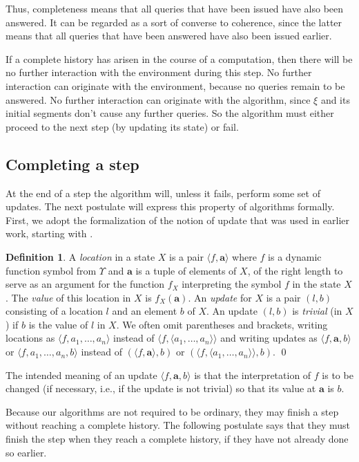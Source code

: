 \documentclass{LMCS}
\theoremstyle{definition}
\newtheorem{df}[thm]{Definition}
\newcommand{\bld}[1]{\ensuremath{\mathbf {#1}}}
\newcommand{\sq}[1]{\ensuremath{\langle#1\rangle}}
\begin{document}
Thus, completeness means that all queries that have been issued have
also been answered.  It can be regarded as a sort of converse to
coherence, since the latter means that all queries that have
been answered have also been issued earlier.

If a complete history has arisen in the course of a computation, then
there will be no further interaction with the environment during this
step.  No further interaction can originate with the environment,
because no queries remain to be answered.  No further interaction can
originate with the algorithm, since $\xi$ and its initial segments
don't cause any further queries.  So the algorithm must either proceed
to the next step (by updating its state) or fail.

\subsection{Completing a step}

At the end of a step the algorithm will, unless it fails, perform some
set of updates.  The next postulate will express this property of
algorithms formally.  First, we adopt the formalization of the notion of
update that was used in earlier work, starting with \cite{seqth}.

\begin{df}
A \emph{location} in a state $X$ is a pair \sq{f,\bld a} where $f$ is
a dynamic function symbol from $\Upsilon$ and $\bld a$ is a tuple of
elements of $X$, of the right length to serve as an argument for the
function $f_X$ interpreting the symbol $f$ in the state $X$.  The
\emph{value} of this location in $X$ is $f_X(\bld a)$.  An
\emph{update} for $X$ is a pair $(l,b)$ consisting of a location $l$
and an element $b$ of $X$.  An update $(l,b)$ is \emph{trivial} (in
$X$) if $b$ is the value of $l$ in $X$.  We often omit parentheses and
brackets, writing locations as \sq{f,a_1,\dots,a_n} instead of
\sq{f,\sq{a_1,\dots,a_n}} and writing updates as \sq{f,\bld a,b} or
\sq{f,a_1,\dots,a_n,b} instead of $(\sq{f,\bld a},b)$
or $(\sq{f,\sq{a_1,\dots,a_n}},b)$.
\qed\end{df}

The intended meaning of an update \sq{f,\bld a,b} is that the
interpretation of $f$ is to be changed (if necessary, i.e., if the
update is not trivial) so that its value at $\bld a$ is $b$.

Because our algorithms are not required to be ordinary, they may
finish a step without reaching a complete history.  The following
postulate says that they must finish the step when they reach a
complete history, if they have not already done so earlier.
\end{document}

